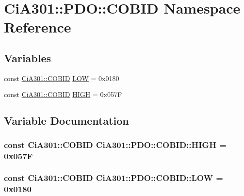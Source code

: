 \hypertarget{namespace_ci_a301_1_1_p_d_o_1_1_c_o_b_i_d}{\section{Ci\-A301\-:\-:P\-D\-O\-:\-:C\-O\-B\-I\-D Namespace Reference}
\label{namespace_ci_a301_1_1_p_d_o_1_1_c_o_b_i_d}
}
\subsection*{Variables}
\begin{DoxyCompactItemize}
\item 
const \hyperlink{namespace_ci_a301_aec5b5dbb2b60d2837c60499f6f297aa7}{Ci\-A301\-::\-C\-O\-B\-I\-D} \hyperlink{namespace_ci_a301_1_1_p_d_o_1_1_c_o_b_i_d_ae0bf8a0a5e40108893af04e8037be329}{L\-O\-W} = 0x0180
\item 
const \hyperlink{namespace_ci_a301_aec5b5dbb2b60d2837c60499f6f297aa7}{Ci\-A301\-::\-C\-O\-B\-I\-D} \hyperlink{namespace_ci_a301_1_1_p_d_o_1_1_c_o_b_i_d_a026539b60cd9df7c6eb9f5492faaeaa1}{H\-I\-G\-H} = 0x057\-F
\end{DoxyCompactItemize}


\subsection{Variable Documentation}
\hypertarget{namespace_ci_a301_1_1_p_d_o_1_1_c_o_b_i_d_a026539b60cd9df7c6eb9f5492faaeaa1}{
\subsubsection[{H\-I\-G\-H}]{\setlength{\rightskip}{0pt plus 5cm}const {\bf Ci\-A301\-::\-C\-O\-B\-I\-D} Ci\-A301\-::\-P\-D\-O\-::\-C\-O\-B\-I\-D\-::\-H\-I\-G\-H = 0x057\-F}}\label{namespace_ci_a301_1_1_p_d_o_1_1_c_o_b_i_d_a026539b60cd9df7c6eb9f5492faaeaa1}
\hypertarget{namespace_ci_a301_1_1_p_d_o_1_1_c_o_b_i_d_ae0bf8a0a5e40108893af04e8037be329}{
\subsubsection[{L\-O\-W}]{\setlength{\rightskip}{0pt plus 5cm}const {\bf Ci\-A301\-::\-C\-O\-B\-I\-D} Ci\-A301\-::\-P\-D\-O\-::\-C\-O\-B\-I\-D\-::\-L\-O\-W = 0x0180}}\label{namespace_ci_a301_1_1_p_d_o_1_1_c_o_b_i_d_ae0bf8a0a5e40108893af04e8037be329}
